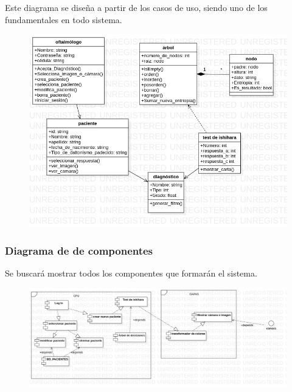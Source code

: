 \documentclass[10pt]{article}
\begin{document}
Este diagrama se diseña a partir de los casos de uso, siendo uno de los fundamentales en todo sistema.

\begin{figure}[H]
	\begin{center}
\includegraphics[scale = 0.65]{UML/Model2!ClassDiagram1_2.jpg}
	\end{center} 
\end{figure}

\newpage
\subsubsection{Diagrama de de componentes}

Se buscará mostrar todos los componentes que formarán el sistema.

\begin{figure}[H]
	\begin{center}
\includegraphics[scale = 0.40]{UML/Model3!ComponentDiagram1_14.jpg}
	\end{center} 
\end{figure}
\end{document}
